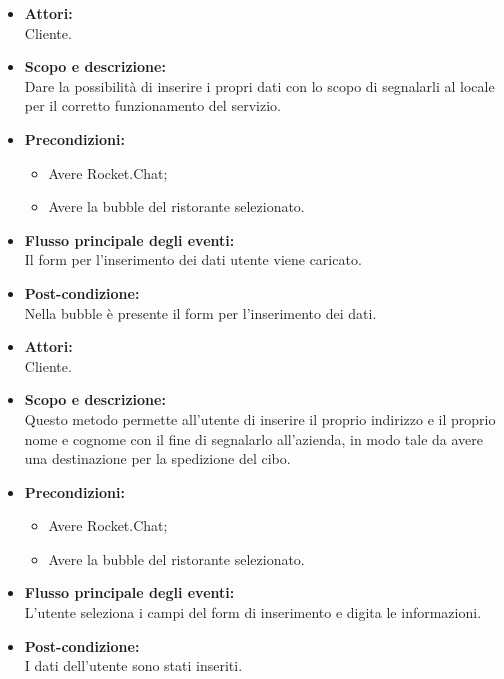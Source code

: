
\begin{itemize}
	\item \textbf{Attori:}
	\\Cliente.
	\item \textbf{Scopo e descrizione:} 
	\\Dare la possibilità di inserire i propri dati con lo scopo di segnalarli al locale per il corretto funzionamento del servizio.
	\item \textbf{Precondizioni:}
	\begin{itemize}
		\item Avere Rocket.Chat;
		\item Avere la bubble del ristorante selezionato.
	\end{itemize}
	\item \textbf{Flusso principale degli eventi:}
	\\Il form per l'inserimento dei dati utente viene caricato.
	\item \textbf{Post-condizione:}
	\\Nella bubble è presente il form per l'inserimento dei dati.
\end{itemize}


\begin{itemize}
	\item \textbf{Attori:}
	\\Cliente.
	\item \textbf{Scopo e descrizione:} 
	\\Questo metodo permette all'utente di inserire il proprio indirizzo e il proprio nome e cognome con il fine di segnalarlo all'azienda, in modo tale da avere una destinazione per la spedizione del cibo.
	\item \textbf{Precondizioni:}
	\begin{itemize}
		\item Avere Rocket.Chat;
		\item Avere la bubble del ristorante selezionato.
	\end{itemize}
	\item \textbf{Flusso principale degli eventi:}
	\\L'utente seleziona i campi del form di inserimento e digita le informazioni.
	\item \textbf{Post-condizione:}
	\\I dati dell'utente sono stati inseriti.
\end{itemize}

